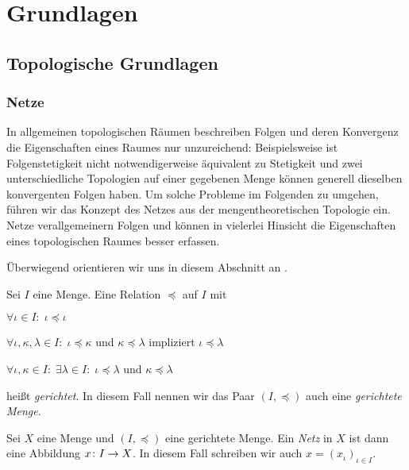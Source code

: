 \documentclass[../main/main.tex]{subfiles}
\begin{document}
	
	\section{Grundlagen}
	
	\subsection{Topologische Grundlagen}
	
	\subsubsection*{Netze}
	
	In allgemeinen topologischen Räumen beschreiben Folgen und deren Konvergenz die Eigenschaften eines Raumes nur unzureichend:
	Beispielsweise ist Folgenstetigkeit nicht notwendigerweise äquivalent zu Stetigkeit und zwei unterschiedliche Topologien auf einer 
	gegebenen Menge können generell dieselben konvergenten Folgen haben. Um solche Probleme im Folgenden zu umgehen, führen wir das
	Konzept des Netzes aus der mengentheoretischen Topologie ein. Netze verallgemeinern Folgen und können in vielerlei Hinsicht die 
	Eigenschaften eines topologischen Raumes besser erfassen.
	
	Überwiegend orientieren wir uns in diesem Abschnitt an \cite[Kapitel 2.6]{Simon.2015}.
	
	\begin{Definition}
		\label{def:directedset}
		Sei $I$ eine Menge. Eine Relation $\preceq$ auf $I$ mit
		\begin{enumeratethm}
			\item $\forall \iota \in I: \; \iota \preceq \iota$
			\item $\forall \iota, \kappa, \lambda \in I: \; \iota \preceq \kappa$ und $\kappa \preceq \lambda$ impliziert $\iota \preceq \lambda$
			\item $\forall \iota, \kappa \in I: \; \exists \lambda \in I: \; \iota \preceq \lambda$ und $\kappa \preceq \lambda$
		\end{enumeratethm}
		heißt \emph{gerichtet}. In diesem Fall nennen wir das Paar $(I, \preceq)$ auch eine \emph{gerichtete Menge}.
	\end{Definition}
	
	\begin{Definition}[Netz]
		Sei $X$ eine Menge und $(I, \preceq)$ eine gerichtete Menge. Ein \emph{Netz} in $X$ ist dann eine Abbildung $x \colon I \to X$. In diesem
		Fall schreiben wir auch $x = (x_\iota)_{\iota \in I}$.
	\end{Definition}
	
\end{document}
